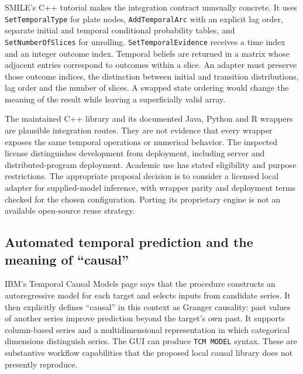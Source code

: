 SMILE's C++ tutorial makes the integration contract unusually concrete.
It uses \texttt{SetTemporalType} for plate nodes,
\texttt{AddTemporalArc} with an explicit lag order, separate initial and
temporal conditional probability tables, and \texttt{SetNumberOfSlices}
for unrolling. \texttt{SetTemporalEvidence} receives a time index and an
integer outcome index. Temporal beliefs are returned in a matrix whose
adjacent entries correspond to outcomes within a slice. An adapter must
preserve those outcome indices, the distinction between initial and
transition distributions, lag order and the number of slices. A swapped
state ordering would change the meaning of the result while leaving a
superficially valid array.~\citep{exec13_ct_smile_tutorial}

The maintained C++ library and its documented Java, Python and R
wrappers are plausible integration routes. They are not evidence that
every wrapper exposes the same temporal operations or numerical
behavior. The inspected license distinguishes development from
deployment, including server and distributed-program deployment.
Academic use has stated eligibility and purpose restrictions. The
appropriate proposal decision is to consider a licensed local adapter
for supplied-model inference, with wrapper parity and deployment terms
checked for the chosen configuration. Porting its proprietary engine is
not an available open-source reuse strategy.
\citep{exec13_smile_intro,exec13_smile_license}

\hypertarget{automated-temporal-prediction-and-the-meaning-of-causal}{%
\subsection{Automated temporal prediction and the meaning of
``causal''}\label{automated-temporal-prediction-and-the-meaning-of-causal}}

IBM's Temporal Causal Models page says that the procedure constructs an
autoregressive model for each target and selects inputs from candidate
series. It then explicitly defines ``causal'' in this context as Granger
causality: past values of another series improve prediction beyond the
target's own past. It supports column-based series and a
multidimensional representation in which categorical dimensions
distinguish series. The GUI can produce \texttt{TCM\ MODEL} syntax.
These are substantive workflow capabilities that the proposed local
causal library does not presently reproduce. \citep{exec13_ct_ibm_tcm}

